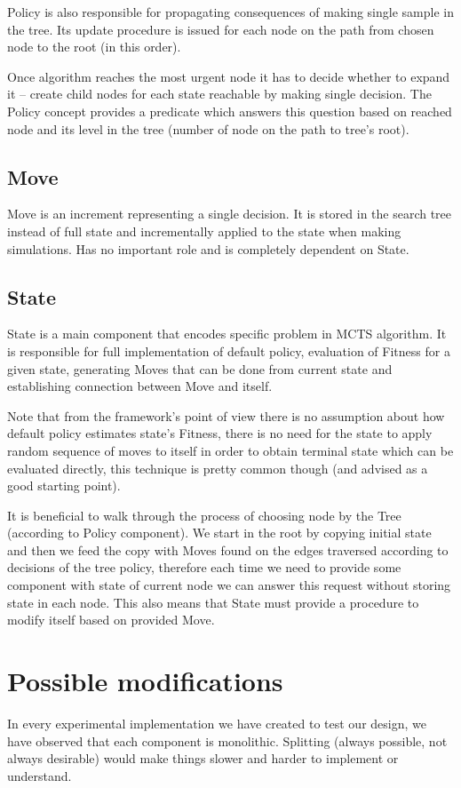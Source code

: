 Policy is also responsible for propagating consequences of making single
sample in the tree. Its update procedure is issued for each node on the path
from chosen node to the root (in this order).

Once algorithm reaches the most urgent node it has to decide whether to expand
it -- create child nodes for each state reachable by making single decision.
The Policy concept provides a predicate which answers this question based on
reached node and its level in the tree (number of node on the path to tree's
root).

\subsection{Move}
Move is an increment representing a single decision. It is stored in the search
tree instead of full state and incrementally applied to the state when making
simulations. Has no important role and is completely dependent on State.

\subsection{State}
State is a main component that encodes specific problem in MCTS algorithm.  It
is responsible for full implementation of default policy, evaluation of Fitness
for a given state, generating Moves that can be done from current state and
establishing connection between Move and itself.

Note that from the framework's point of view there is no assumption about how
default policy estimates state's Fitness, there is no need for the state to
apply random sequence of moves to itself in order to obtain terminal state
which can be evaluated directly, this technique is pretty common though (and
advised as a good starting point).

It is beneficial to walk through the process of choosing node by the Tree
(according to Policy component). We start in the root by copying initial state
and then we feed the copy with Moves found on the edges traversed according to
decisions of the tree policy, therefore each time we need to provide some
component with state of current node we can answer this request without
storing state in each node. This also means that State must provide a procedure
to modify itself based on provided Move.

\section{Possible modifications}
In every experimental implementation we have created to test our design, we
have observed that each component is monolithic. Splitting (always possible,
not always desirable) would make things slower and harder to implement or
understand.

